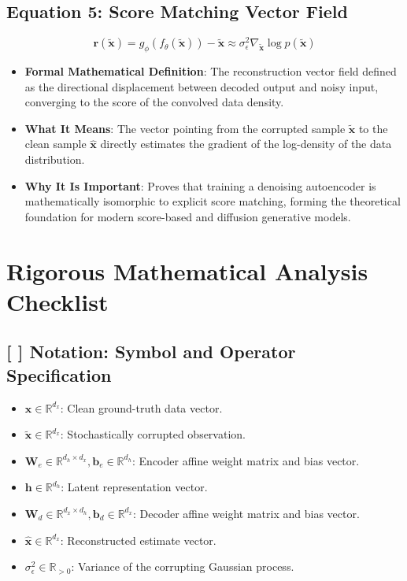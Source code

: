 \documentclass[11pt,a4paper]{article}
\theoremstyle{definition}
\begin{document}
\subsection{\textbf{Equation 5: Score Matching Vector Field}}
{\boldmath
\begin{equation}
\mathbf{r}(\tilde{\mathbf{x}}) = g_\phi(f_\theta(\tilde{\mathbf{x}})) - \tilde{\mathbf{x}} \approx \sigma_\epsilon^2 \nabla_{\tilde{\mathbf{x}}} \log p(\tilde{\mathbf{x}})
\end{equation}
}
\begin{itemize}
    \item \textbf{Formal Mathematical Definition}:
    The reconstruction vector field defined as the directional displacement between decoded output and noisy input, converging to the score of the convolved data density.
    \item \textbf{What It Means}:
    The vector pointing from the corrupted sample $\tilde{\mathbf{x}}$ to the clean sample $\hat{\mathbf{x}}$ directly estimates the gradient of the log-density of the data distribution.
    \item \textbf{Why It Is Important}:
    Proves that training a denoising autoencoder is mathematically isomorphic to explicit score matching, forming the theoretical foundation for modern score-based and diffusion generative models.
\end{itemize}

\section{Rigorous Mathematical Analysis Checklist}

\subsection{[ ] Notation: Symbol and Operator Specification}
\begin{itemize}
    \item $\mathbf{x} \in \mathbb{R}^{d_x}$: Clean ground-truth data vector.
    \item $\tilde{\mathbf{x}} \in \mathbb{R}^{d_x}$: Stochastically corrupted observation.
    \item $\mathbf{W}_e \in \mathbb{R}^{d_h \times d_x}, \mathbf{b}_e \in \mathbb{R}^{d_h}$: Encoder affine weight matrix and bias vector.
    \item $\mathbf{h} \in \mathbb{R}^{d_h}$: Latent representation vector.
    \item $\mathbf{W}_d \in \mathbb{R}^{d_x \times d_h}, \mathbf{b}_d \in \mathbb{R}^{d_x}$: Decoder affine weight matrix and bias vector.
    \item $\hat{\mathbf{x}} \in \mathbb{R}^{d_x}$: Reconstructed estimate vector.
    \item $\sigma_\epsilon^2 \in \mathbb{R}_{> 0}$: Variance of the corrupting Gaussian process.
\end{itemize}
\end{document}
